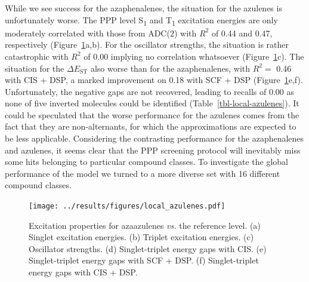 \documentclass[
  number,
  3p]{elsarticle}
\newcommand{\DeltaE}[2][]{\Delta E^{\mathrm{#1}}_{\mathrm{#2}}}
\begin{document}
While we see success for the azaphenalenes, the situation for the
azulenes is unfortunately worse. The PPP level S\textsubscript{1} and
T\textsubscript{1} excitation energies are only moderately correlated
with those from ADC(2) with \(R^2\) of 0.44 and 0.47, respectively
(Figure~\ref{fig-local-azulenes}a,b). For the oscillator strengths, the
situation is rather catastrophic with \(R^2\) of 0.00 implying no
correlation whatsoever (Figure~\ref{fig-local-azulenes}c). The situation
for the \(\DeltaE{ST}\) also worse than for the azaphenalenes, with
\(R^2=\) 0.46 with CIS + DSP, a marked improvement on 0.18 with SCF +
DSP (Figure~\ref{fig-local-azulenes}e,f). Unfortunately, the negative
gaps are not recovered, leading to recalls of 0.00 as none of five
inverted molecules could be identified (Table~\ref{tbl-local-azulenes}).
It could be speculated that the worse performance for the azulenes comes
from the fact that they are non-alternants, for which the approximations
are expected to be less applicable. Considering the contrasting
performance for the azaphenalenes and azulenes, it seems clear that the
PPP screening protocol will inevitably miss some hits belonging to
particular compound classes. To investigate the global performance of
the model we turned to a more diverse set with 16 different compound
classes.

\begin{figure}

{\centering \texttt{[image: ../results/figures/local\_azulenes.pdf]}

}

\caption{\label{fig-local-azulenes}Excitation properties for azaazulenes
\emph{vs.} the reference level. (a) Singlet excitation energies. (b)
Triplet excitation energies. (c) Oscillator strengths. (d)
Singlet-triplet energy gaps with CIS. (e) Singlet-triplet energy gaps
with SCF + DSP. (f) Singlet-triplet energy gaps with CIS + DSP.}

\end{figure}
\end{document}
